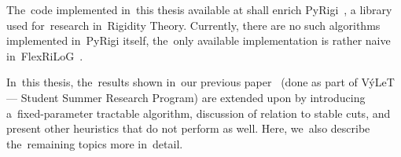 The~code implemented in~this thesis available at \cite{my_code}
shall enrich PyRigi~\cite{pyrigi},
a library used for~research in~Rigidity Theory.
Currently, there are no such algorithms implemented in~PyRigi itself,
the~only available implementation is rather naive in~FlexRiLoG~\cite{flexrilog}.

In~this thesis, the~results shown in~our previous paper~\cite{my_paper}
(done as part of VýLeT --- Student Summer Research Program)
are extended upon by introducing a~fixed-parameter tractable algorithm,
discussion of relation to stable cuts,
and present other heuristics that do not perform as well.
Here, we~also describe the~remaining topics more in~detail.

